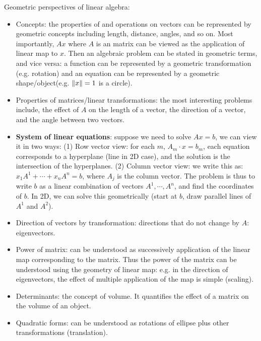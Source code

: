 \documentclass{report}
\begin{document}
Geometric perspectives of linear algebra: 
\begin{itemize}
	\item Concepts: the properties of and operations on vectors can be represented by geometric concepts including length, distance, angles, and so on. Most importantly, $Ax$ where $A$ is an matrix can be viewed as the application of linear map to $x$. Then an algebraic problem can be stated in geometric terms, and vice versa: a function can be represented by a geometric transformation (e.g. rotation) and an equation can be represented by a geometric shape/object(e.g. $\lVert x\rVert = 1$ is a circle). 
	
	\item Properties of matrices/linear transformations: the most interesting problems include, the effect of $A$ on the length of a vector, the direction of a vector, and the angle between two vectors. 
	
	\item \textbf{System of linear equations}: suppose we need to solve $Ax = b$, we can view it in two ways: (1) Row vector view: for each $m$, $A_m \cdot x = b_m$, each equation corresponds to a hyperplane (line in 2D case), and the solution is the intersection of the hyperplanes. (2) Column vector view: we write this as: $x_1 A^1 + \cdots + x_n A^n = b$, where $A_j$ is the column vector. The problem is thus to write $b$ as a linear combination of vectors $A^1, \cdots, A^n$, and find the coordinates of $b$. In 2D, we can solve this geometrically (start at $b$, draw parallel lines of $A^1$ and $A^2$). 
		
	\item Direction of vectors by transformation: directions that do not change by $A$: eigenvectors.

	\item Power of matrix: can be understood as successively application of the linear map corresponding to the matrix. Thus the power of the matrix can be understood using the geometry of linear map: e.g. in the direction of eigenvectors, the effect of multiple application of the map is simple (scaling). 
	
	\item Determinants: the concept of volume. It quantifies the effect of a matrix on the volume of an object. 
			
	\item Quadratic forms: can be understood as rotations of ellipse plus other transformations (translation). 
\end{itemize}
\end{document}
